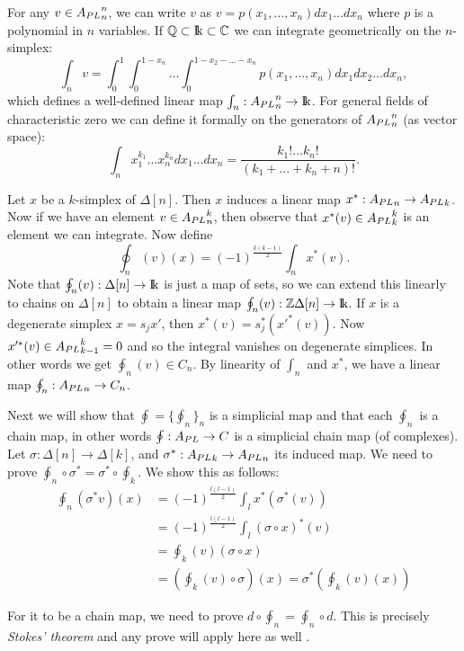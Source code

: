 For any $v \in {A_{PL}}_n^n$, we can write $v$ as $v = p(x_1, \dots, x_n)dx_1 \dots dx_n$ where $p$ is a polynomial in $n$ variables. If $\mathbb{Q} \subset \mathrm{I\!k} \subset \mathbb{C}$ we can integrate geometrically on the $n$-simplex:
$$ \int_n v = \int_0^1 \int_0^{1-x_n} \dots \int_0^{1 - x_2 - \dots - x_n} p(x_1, \dots, x_n) dx_1 dx_2 \dots dx_n, $$
which defines a well-defined linear map $\int_n : {A_{PL}}_n^n \to \mathrm{I\!k}$. For general fields of characteristic zero we can define it formally on the generators of ${A_{PL}}_n^n$ (as vector space):
$$ \int_n x_1^{k_1} \dots x_n^{k_n} dx_1 \dots dx_n = \frac{k_1! \dots k_n!}{(k_1 + \dots + k_n + n)!}. $$

Let $x$ be a $k$-simplex of $\Delta[n]$. Then $x$ induces a linear map $x^\ast: {A_{PL}}_n \to {A_{PL}}_k$. Now if we have an element $v \in {A_{PL}}_n^k$, then observe that $x^\ast(v) \in {A_{PL}}_k^k$ is an element we can integrate. Now define
$$ \oint_n(v)(x) = (-1)^\frac{k(k-1)}{2} \int_n x^\ast(v). $$
Note that $\oint_n(v): \Delta[n] \to \mathrm{I\!k}$ is just a map of sets, so we can extend this linearly to chains on $\Delta[n]$ to obtain a linear map $\oint_n(v): \mathbb{Z}\Delta[n] \to \mathrm{I\!k}$. 
If $x$ is a degenerate simplex $x = s_j x'$, then $x^\ast(v) = s_j^\ast (x'^\ast (v))$. Now $x'^\ast (v) \in {A_{PL}}_{k-1}^k = 0$ and so the integral vanishes on degenerate simplices. In other words we get $\oint_n(v) \in C_n$. By linearity of $\int_n$ and $x^\ast$, we have a linear map $\oint_n: {A_{PL}}_n \to C_n$.

Next we will show that $\oint = \{\oint_n\}_n$ is a simplicial map and that each $\oint_n$ is a chain map, in other words $\oint : {A_{PL}} \to C$ is a simplicial chain map (of complexes). Let $\sigma: \Delta[n] \to \Delta[k]$, and $\sigma^\ast: {A_{PL}}_k \to {A_{PL}}_n$ its induced map. We need to prove $\oint_n \circ \sigma^\ast = \sigma^\ast \circ \oint_k$. We show this as follows:
\begin{align*}
	\oint_n (\sigma^\ast v)(x)
	&= (-1)^\frac{l(l-1)}{2} \int_l x^\ast(\sigma^\ast(v)) \\
	&= (-1)^\frac{l(l-1)}{2} \int_l (\sigma \circ x)^\ast(v) \\
	&= \oint_k (v)(\sigma \circ x) \\
	&= (\oint_k (v) \circ \sigma) (x) = \sigma^\ast (\oint_k(v)(x))
\end{align*}

For it to be a chain map, we need to prove $d \circ \oint_n = \oint_n \circ d$. This is precisely \emph{Stokes' theorem} and any prove will apply here as well \cite{bousfield}.

